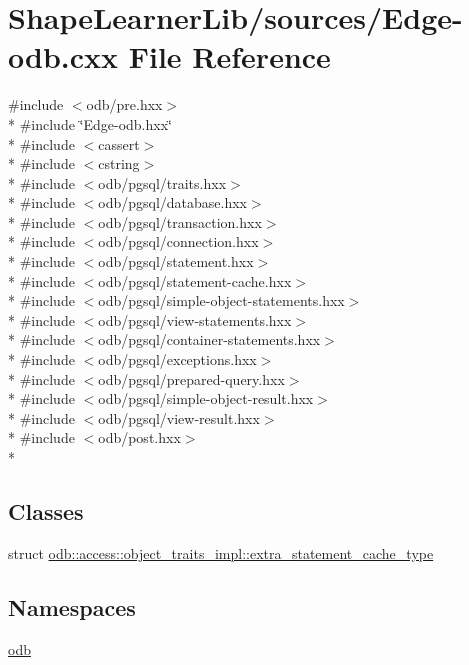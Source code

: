\hypertarget{_edge-odb_8cxx}{}\section{Shape\+Learner\+Lib/sources/\+Edge-\/odb.cxx File Reference}
\label{_edge-odb_8cxx}
{\ttfamily \#include $<$odb/pre.\+hxx$>$}\\*
{\ttfamily \#include \char`\"{}Edge-\/odb.\+hxx\char`\"{}}\\*
{\ttfamily \#include $<$cassert$>$}\\*
{\ttfamily \#include $<$cstring$>$}\\*
{\ttfamily \#include $<$odb/pgsql/traits.\+hxx$>$}\\*
{\ttfamily \#include $<$odb/pgsql/database.\+hxx$>$}\\*
{\ttfamily \#include $<$odb/pgsql/transaction.\+hxx$>$}\\*
{\ttfamily \#include $<$odb/pgsql/connection.\+hxx$>$}\\*
{\ttfamily \#include $<$odb/pgsql/statement.\+hxx$>$}\\*
{\ttfamily \#include $<$odb/pgsql/statement-\/cache.\+hxx$>$}\\*
{\ttfamily \#include $<$odb/pgsql/simple-\/object-\/statements.\+hxx$>$}\\*
{\ttfamily \#include $<$odb/pgsql/view-\/statements.\+hxx$>$}\\*
{\ttfamily \#include $<$odb/pgsql/container-\/statements.\+hxx$>$}\\*
{\ttfamily \#include $<$odb/pgsql/exceptions.\+hxx$>$}\\*
{\ttfamily \#include $<$odb/pgsql/prepared-\/query.\+hxx$>$}\\*
{\ttfamily \#include $<$odb/pgsql/simple-\/object-\/result.\+hxx$>$}\\*
{\ttfamily \#include $<$odb/pgsql/view-\/result.\+hxx$>$}\\*
{\ttfamily \#include $<$odb/post.\+hxx$>$}\\*
\subsection*{Classes}
\begin{DoxyCompactItemize}
\item 
struct \hyperlink{structodb_1_1access_1_1object__traits__impl_1_1extra__statement__cache__type}{odb\+::access\+::object\+\_\+traits\+\_\+impl\+::extra\+\_\+statement\+\_\+cache\+\_\+type}
\end{DoxyCompactItemize}
\subsection*{Namespaces}
\begin{DoxyCompactItemize}
\item 
 \hyperlink{namespaceodb}{odb}
\end{DoxyCompactItemize}
